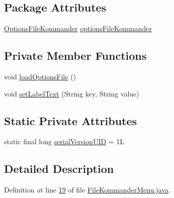 \subsection*{Package Attributes}
\begin{DoxyCompactItemize}
\item 
\hyperlink{classcom_1_1poly_1_1nlp_1_1filekommander_1_1views_1_1_options_file_kommander}{Options\-File\-Kommander} \hyperlink{classcom_1_1poly_1_1nlp_1_1filekommander_1_1views_1_1_file_kommander_menu_a003b2d89fc465db1befab3410121166d}{options\-File\-Kommander}
\end{DoxyCompactItemize}
\subsection*{Private Member Functions}
\begin{DoxyCompactItemize}
\item 
void \hyperlink{classcom_1_1poly_1_1nlp_1_1filekommander_1_1views_1_1_file_kommander_menu_a978d1a80fa281d2548206d86204b3616}{load\-Options\-File} ()
\item 
void \hyperlink{classcom_1_1poly_1_1nlp_1_1filekommander_1_1views_1_1_file_kommander_menu_afcd1856362c78beb91904ec0976cbcf9}{set\-Label\-Text} (String key, String value)
\end{DoxyCompactItemize}
\subsection*{Static Private Attributes}
\begin{DoxyCompactItemize}
\item 
static final long \hyperlink{classcom_1_1poly_1_1nlp_1_1filekommander_1_1views_1_1_file_kommander_menu_ae9f2507a684bcf4de4a7196385e179c7}{serial\-Version\-U\-I\-D} = 1\-L
\end{DoxyCompactItemize}


\subsection{Detailed Description}


Definition at line \hyperlink{L19}{19} of file \hyperlink{}{File\-Kommander\-Menu.\-java}.



